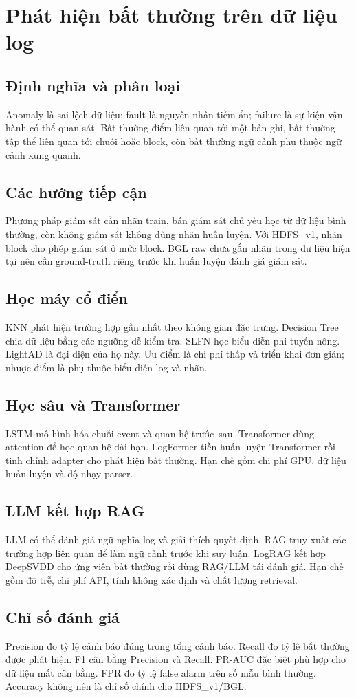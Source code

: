 \section{Phát hiện bất thường trên dữ liệu log}

\subsection{Định nghĩa và phân loại}
Anomaly là sai lệch dữ liệu; fault là nguyên nhân tiềm ẩn; failure là sự kiện
vận hành có thể quan sát. Bất thường điểm liên quan tới một bản ghi, bất thường
tập thể liên quan tới chuỗi hoặc block, còn bất thường ngữ cảnh phụ thuộc
ngữ cảnh xung quanh.

\subsection{Các hướng tiếp cận}
Phương pháp giám sát cần nhãn train, bán giám sát chủ yếu học từ dữ liệu
bình thường, còn không giám sát không dùng nhãn huấn luyện. Với HDFS\_v1,
nhãn block cho phép giám sát ở mức block. BGL raw chưa gắn nhãn trong dữ liệu
hiện tại nên cần ground-truth riêng trước khi huấn luyện đánh giá giám sát.

\subsection{Học máy cổ điển}
KNN phát hiện trường hợp gần nhất theo không gian đặc trưng. Decision Tree
chia dữ liệu bằng các ngưỡng dễ kiểm tra. SLFN học biểu diễn phi tuyến nông.
LightAD là đại diện của họ này. Ưu điểm là chi phí thấp và triển khai đơn giản;
nhược điểm là phụ thuộc biểu diễn log và nhãn.

\subsection{Học sâu và Transformer}
LSTM mô hình hóa chuỗi event và quan hệ trước--sau. Transformer dùng attention
để học quan hệ dài hạn. LogFormer tiền huấn luyện Transformer rồi tinh chỉnh
adapter cho phát hiện bất thường. Hạn chế gồm chi phí GPU, dữ liệu huấn luyện
và độ nhạy parser.

\subsection{LLM kết hợp RAG}
LLM có thể đánh giá ngữ nghĩa log và giải thích quyết định. RAG truy xuất các
trường hợp liên quan để làm ngữ cảnh trước khi suy luận. LogRAG kết hợp
DeepSVDD cho ứng viên bất thường rồi dùng RAG/LLM tái đánh giá. Hạn chế gồm
độ trễ, chi phí API, tính không xác định và chất lượng retrieval.

\subsection{Chỉ số đánh giá}
Precision đo tỷ lệ cảnh báo đúng trong tổng cảnh báo. Recall đo tỷ lệ bất
thường được phát hiện. F1 cân bằng Precision và Recall. PR-AUC đặc biệt phù
hợp cho dữ liệu mất cân bằng. FPR đo tỷ lệ false alarm trên số mẫu bình
thường. Accuracy không nên là chỉ số chính cho HDFS\_v1/BGL.
